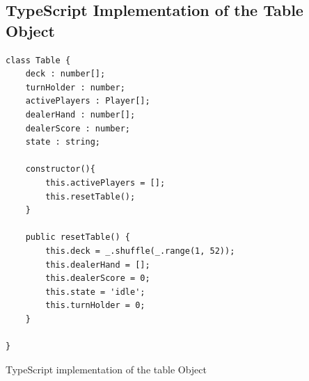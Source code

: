\documentclass[a4paper]{article}
\begin{document}

\newpage
\begin{appendices}
%
%  
%
%
%
%
%

\section{TypeScript Implementation of the Table Object}
\label{app_ts}
\begin{listing}[H]
\begin{verbatim}
class Table {
    deck : number[];
    turnHolder : number;
    activePlayers : Player[];
    dealerHand : number[];
    dealerScore : number;
    state : string;

    constructor(){
        this.activePlayers = [];
        this.resetTable();
    }

    public resetTable() {
        this.deck = _.shuffle(_.range(1, 52));
        this.dealerHand = [];
        this.dealerScore = 0;
        this.state = 'idle';
        this.turnHolder = 0;
    }
    
}
\end{verbatim}
\caption{TypeScript implementation of the table Object}
\label{lst_table}
\end{listing}



\end{appendices}
\end{document}
